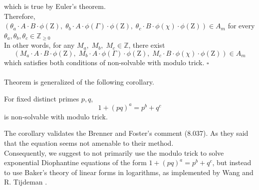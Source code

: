 \documentclass[12pt]{article}
\begin{document}
which is true by Euler's theorem. \\
Therefore, $(\theta_a\cdot A\cdot B \cdot \phi(\mathrm{Z}), \; \theta_b\cdot A\cdot \phi (\Gamma)\cdot \phi(\mathrm{Z}) , \; \theta_c \cdot B\cdot \phi(\chi) \cdot \phi(\mathrm{Z})) \in A_m$ for every $\theta_a, \theta_b,  \theta_c \in \mathbb{Z}_{\geq 0}$\\
In other words, for any $M_a,\;M_b,\;M_c \in \mathbb{Z}$, there exist \[(M_a\cdot A\cdot B \cdot \phi(\mathrm{Z}), \; M_b\cdot A\cdot \phi (\Gamma)\cdot \phi(\mathrm{Z}) , \; M_c \cdot B\cdot \phi(\chi) \cdot \phi(\mathrm{Z})) \in A_m \] 
which satisfies both conditions of non-solvable with modulo trick. $\square$
\\\\
Theorem is generalized of the following corollary.
\begin{corollary}
 For fixed distinct primes $p,q$,
    \[1+(pq)^a = p^b +q^c\]
is non-solvable with modulo trick.
\end{corollary}
\noindent
\hspace*{0.5cm}The corollary validates the \cite{eDe} Brenner and Foster's comment (8.037). As they said that the equation seems not amenable to their method.\\
\hspace*{0.5cm}Consequently, we suggest to not primarily use the modulo trick to solve exponential Diophantine equations of the form $1+(pq)^a = p^b + q^c$, but instead to use Baker’s theory of linear forms in logarithms, as implemented by Wang and R. Tijdeman \cite{wang}.
\newpage
\end{document}

